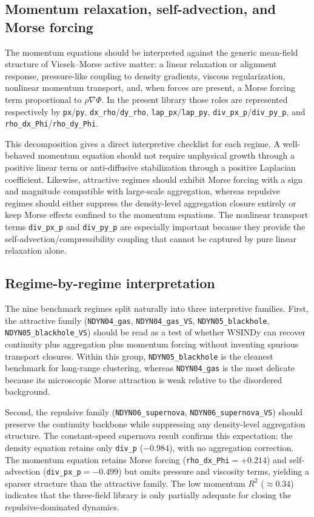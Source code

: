 \subsection{Momentum relaxation, self-advection, and Morse forcing}

The momentum equations should be interpreted against the generic mean-field
structure of Vicsek--Morse active matter: a linear relaxation or alignment
response, pressure-like coupling to density gradients, viscous regularization,
nonlinear momentum transport, and, when forces are present, a Morse forcing
term proportional to $\rho \nabla \Phi$.  In the present library those roles
are represented respectively by \texttt{px}/\texttt{py},
\texttt{dx\_rho}/\texttt{dy\_rho}, \texttt{lap\_px}/\texttt{lap\_py},
\texttt{div\_px\_p}/\texttt{div\_py\_p}, and
\texttt{rho\_dx\_Phi}/\texttt{rho\_dy\_Phi}.

This decomposition gives a direct interpretive checklist for each regime.  A
well-behaved momentum equation should not require unphysical growth through a
positive linear term or anti-diffusive stabilization through a positive
Laplacian coefficient.  Likewise, attractive regimes should exhibit Morse
forcing with a sign and magnitude compatible with large-scale aggregation,
whereas repulsive regimes should either suppress the density-level aggregation
closure entirely or keep Morse effects confined to the momentum equations.  The
nonlinear transport terms \texttt{div\_px\_p} and \texttt{div\_py\_p} are
especially important because they provide the self-advection/compressibility
coupling that cannot be captured by pure linear relaxation alone.

\subsection{Regime-by-regime interpretation}

The nine benchmark regimes split naturally into three interpretive families.
First, the attractive family
(\texttt{NDYN04\_gas}, \texttt{NDYN04\_gas\_VS},
\texttt{NDYN05\_blackhole}, \texttt{NDYN05\_blackhole\_VS}) should be read as a
test of whether WSINDy can recover continuity plus aggregation plus momentum
forcing without inventing spurious transport closures.  Within this group,
\texttt{NDYN05\_blackhole} is the cleanest benchmark for long-range clustering,
whereas \texttt{NDYN04\_gas} is the most delicate because its microscopic Morse
attraction is weak relative to the disordered background.

Second, the repulsive family
(\texttt{NDYN06\_supernova}, \texttt{NDYN06\_supernova\_VS}) should preserve the
continuity backbone while suppressing any density-level aggregation structure.
The constant-speed supernova result confirms this expectation: the density
equation retains only \texttt{div\_p} ($-0.984$), with no aggregation
correction.  The momentum equation retains Morse forcing
(\texttt{rho\_dx\_Phi}${}=+0.214$) and self-advection
(\texttt{div\_px\_p}${}=-0.499$) but omits pressure and viscosity terms,
yielding a sparser structure than the attractive family.  The low momentum
$R^2$ ($\approx 0.34$) indicates that the three-field library is only
partially adequate for closing the repulsive-dominated dynamics.

